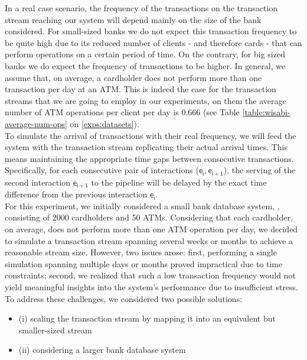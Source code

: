 In a real case scenario, the frequency of the transactions on the transaction stream reaching our system will depend mainly on the size of the bank considered. For small-sized banks we do not expect this transaction frequency to be quite high due to its reduced number of clients - and therefore cards - that can perform operations on a certain period of time. On the contrary, for big sized banks we do expect the frequency of transactions to be higher.
In general, we assume that, on average, a cardholder does not perform more than one transaction per day at an ATM. This is indeed the case for the transaction streams that we are going to employ in our experiments, on them the average number of ATM operations per client per day is $\mathsf{0.666}$ (see Table \ref{table:wisabi-average-num-ops} on \ref{exps:datasets}).\\

To simulate the arrival of transactions with their real frequency, we will feed the system with the transaction stream replicating their actual arrival times. This means maintaining the appropriate time gaps between consecutive transactions. Specifically, for each consecutive pair of interactions ($\mathsf{e_i, e_{i+1}}$), the serving of the second interaction $\mathsf{e_{i+1}}$ to the pipeline will be delayed by the exact time difference from the previous interaction $\mathsf{e_{i}}$.\\

For this experiment, we initially considered a small bank database system, \smallG, consisting of 2000 cardholders and 50 ATMs. Considering that each cardholder, on average, does not perform more than one ATM operation per day, we decided to simulate a transaction stream spanning several weeks or months to achieve a reasonable stream size. However, two issues arose: first, performing a single simulation spanning multiple days or months proved impractical due to time constraints; second, we realized that such a low transaction frequency would not yield meaningful insights into the system's performance due to insufficient stress. To address these challenges, we considered two possible solutions:
\begin{itemize}
    \item (i) scaling the transaction stream by mapping it into an equivalent but smaller-sized stream
    \item (ii) considering a larger bank database system
\end{itemize}

